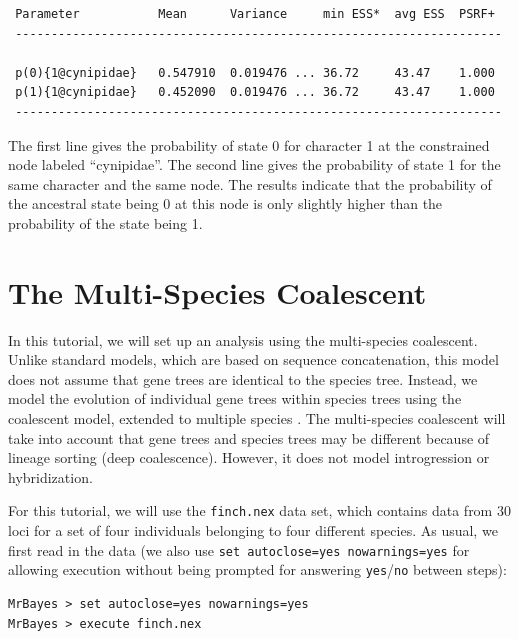 \documentclass[12pt]{book}
\newcommand{\ttt}[1]{\texttt{#1}}
\begin{document}
\begin{singlespacing}
\footnotesize
\begin{verbatim}
 Parameter           Mean      Variance     min ESS*  avg ESS  PSRF+
 --------------------------------------------------------------------

 p(0){1@cynipidae}   0.547910  0.019476 ... 36.72     43.47    1.000
 p(1){1@cynipidae}   0.452090  0.019476 ... 36.72     43.47    1.000
 --------------------------------------------------------------------
\end{verbatim}
\end{singlespacing}
\normalsize

The first line gives the probability of state 0 for character 1 at the constrained node labeled
``cynipidae''. The second line gives the probability of state 1 for the same character and the same
node. The results indicate that the probability of the ancestral state being 0 at this node is only
slightly higher than the probability of the state being 1.


\section{The Multi-Species Coalescent}
\label{theMultiSpeciesCoalescent}

In this tutorial, we will set up an analysis using the multi-species coalescent. Unlike standard
models, which are based on sequence concatenation, this model does not assume that gene trees are
identical to the species tree. Instead, we model the evolution of individual gene trees within
species trees using the coalescent model, extended to multiple species \citep{liu07,edwards07}. The
multi-species coalescent will take into account that gene trees and species trees may be different
because of lineage sorting (deep coalescence). However, it does not model introgression or
hybridization.

For this tutorial, we will use the \ttt{finch.nex} data set, which contains data from 30 loci for a
set of four individuals belonging to four different species. As usual, we first read in the data
(we also use \ttt{set autoclose=yes nowarnings=yes} for allowing execution without being prompted
for answering \ttt{yes}/\ttt{no} between steps):

\begin{singlespacing}
\small
\begin{verbatim}
MrBayes > set autoclose=yes nowarnings=yes
MrBayes > execute finch.nex
\end{verbatim}
\end{singlespacing}
\normalsize
\end{document}
